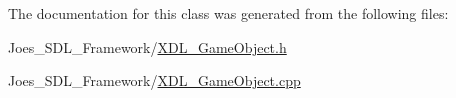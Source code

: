 The documentation for this class was generated from the following files\-:\begin{DoxyCompactItemize}
\item 
Joes\-\_\-\-S\-D\-L\-\_\-\-Framework/\hyperlink{_x_d_l___game_object_8h}{X\-D\-L\-\_\-\-Game\-Object.\-h}\item 
Joes\-\_\-\-S\-D\-L\-\_\-\-Framework/\hyperlink{_x_d_l___game_object_8cpp}{X\-D\-L\-\_\-\-Game\-Object.\-cpp}\end{DoxyCompactItemize}
